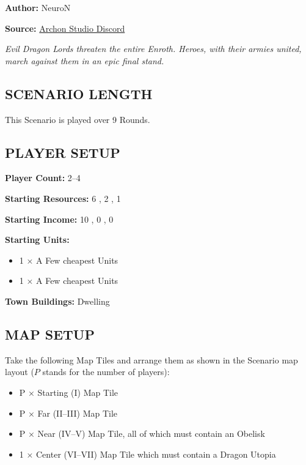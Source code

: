 
\begin{multicols}{2}

\textbf{Author:} NeuroN

\textbf{Source:} \href{https://discord.com/channels/740870068178649108/1332731339614453802/1332731339614453802}{Archon Studio Discord}

\textit{Evil Dragon Lords threaten the entire Enroth. Heroes, with their armies united, march against them in an epic final stand.}

\subsection*{\MakeUppercase{Scenario Length}}

This Scenario is played over 9 Rounds.

\subsection*{\MakeUppercase{Player Setup}}

\textbf{Player Count:} 2--4

\textbf{Starting Resources:} 6 , 2 , 1 

\textbf{Starting Income:} 10 , 0 , 0 

\textbf{Starting Units:}
\begin{itemize}
  \item  1 × A Few cheapest  Units
  \item  1 × A Few cheapest  Units
\end{itemize}

\textbf{Town Buildings:}  Dwelling

\subsection*{\MakeUppercase{Map Setup}}

Take the following Map Tiles and arrange them as shown in the Scenario map layout ($P$ stands for the number of players):

\begin{itemize}
  \item P × Starting (I) Map Tile
  \item P × Far (II--III) Map Tile
  \item P × Near (IV--V) Map Tile, all of which must contain an Obelisk
  \item 1 × Center (VI--VII) Map Tile which must contain a Dragon Utopia
\end{itemize}


\end{multicols}
